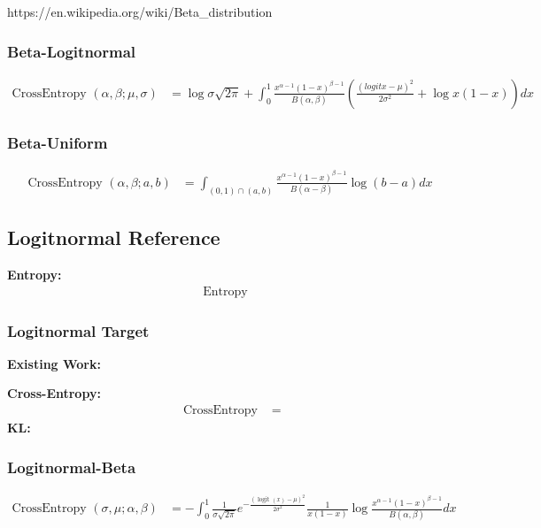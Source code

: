 \documentclass{article}
\begin{document}
https://en.wikipedia.org/wiki/Beta\_distribution

\subsubsection{Beta-Logitnormal}

$$ \begin{aligned} \text {CrossEntropy }\left(\alpha, \beta ; \mu, \sigma \right)&=
\log\sigma\sqrt{2\pi}+\int_{0}^{1} \frac{x^{\alpha-1}(1-x)^{\beta-1}}{B(\alpha ,\beta)} (\frac{(logitx-\mu)^2}{2\sigma^{2}}+\log{x(1-x)} )dx
\end{aligned} $$


\subsubsection{Beta-Uniform}
$$ \begin{aligned} \text {CrossEntropy }\left(\alpha, \beta ; a, b\right)&=
\int_{(0,1)\cap(a,b) } \frac{x^{\alpha-1}(1-x)^{\beta-1}}{B(\alpha-\beta)}\log(b-a) dx
\end{aligned} $$

\subsection{Logitnormal Reference}

\noindent \textbf{Entropy:}
$$ \begin{aligned} \text { Entropy }&
\end{aligned} $$



\subsubsection{Logitnormal Target}

\noindent \textbf{Existing Work:}

\noindent \textbf{Cross-Entropy:}
$$ \begin{aligned} \text { CrossEntropy }&=
\end{aligned} $$
\noindent \textbf{KL:}


\subsubsection{Logitnormal-Beta}
$$ \begin{aligned} \text {CrossEntropy }\left(\sigma,\mu ;\alpha, \beta \right)&=
-\int_{0}^{1}\frac{1}{\sigma \sqrt{2 \pi}} e^{-\frac{(\operatorname{logit}(x)-\mu)^{2}}{2 \sigma^{2}}} \frac{1}{x(1-x)} \log\frac{x^{\alpha-1}(1-x)^{\beta-1}}{B(\alpha,\beta)}dx
\end{aligned} $$
\end{document}
